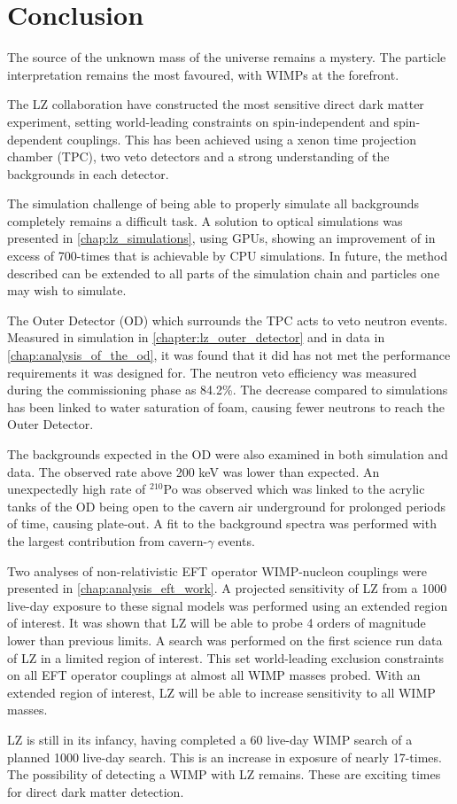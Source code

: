 \chapter{Conclusion}
\par
The source of the unknown mass of the universe remains a mystery.
The particle interpretation remains the most favoured, with WIMPs at the forefront.
\par
The LZ collaboration have constructed the most sensitive direct dark matter experiment, setting world-leading constraints on spin-independent and spin-dependent couplings.
This has been achieved using a xenon time projection chamber (TPC), two veto detectors and a strong understanding of the backgrounds in each detector.

\par
The simulation challenge of being able to properly simulate all backgrounds completely remains a difficult task.
A solution to optical simulations was presented in \autoref{chap:lz_simulations}, using GPUs, showing an improvement of in excess of 700-times that is achievable by CPU simulations.
In future, the method described can be extended to all parts of the simulation chain and particles one may wish to simulate.

\par
The Outer Detector (OD) which surrounds the TPC acts to veto neutron events.
Measured in simulation in \autoref{chapter:lz_outer_detector} and in data in \autoref{chap:analysis_of_the_od}, it was found that it did has not met the performance requirements it was designed for.
The neutron veto efficiency was measured during the commissioning phase as 84.2\%.
The decrease compared to simulations has been linked to water saturation of foam, causing fewer neutrons to reach the Outer Detector.
\par
The backgrounds expected in the OD were also examined in both simulation and data.
The observed rate above 200 keV was lower than expected.
An unexpectedly high rate of ${}^{210}$Po was observed which was linked to the acrylic tanks of the OD being open to the cavern air underground for prolonged periods of time, causing plate-out.
A fit to the background spectra was performed with the largest contribution from cavern-$\gamma$ events.

\par
Two analyses of non-relativistic EFT operator WIMP-nucleon couplings were presented in \autoref{chap:analysis_eft_work}.
A projected sensitivity of LZ from a 1000 live-day exposure to these signal models was performed using an extended region of interest.
It was shown that LZ will be able to probe 4 orders of magnitude lower than previous limits.
A search was performed on the first science run data of LZ in a limited region of interest.
This set world-leading exclusion constraints on all EFT operator couplings at almost all WIMP masses probed.
With an extended region of interest, LZ will be able to increase sensitivity to all WIMP masses.

\par
LZ is still in its infancy, having completed a 60 live-day WIMP search of a planned 1000 live-day search.
This is an increase in exposure of nearly 17-times.
The possibility of detecting a WIMP with LZ remains.
These are exciting times for direct dark matter detection.
